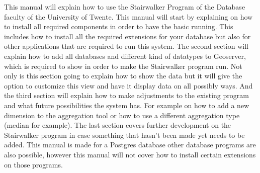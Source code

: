 
This manual will explain how to use the Stairwalker Program of the Database faculty of the University of Twente. This manual will start by explaining on how to install all required components in order to have the basic running. This includes how to install all the required extensions for your database but also for other applications that are required to run this system. The second section will explain how to add all databases and different kind of datatypes to Geoserver, which is required to show in order to make the Stairwalker program run. Not only is this section going to explain how to show the data but it will give the option to customize this view and have it display data on all possibly ways. And the third section will explain how to make adjustments to the existing program and what future possibilities the system has. For example on how to add a new dimension to the aggregation tool or how to use a different aggregation type (median for example). The last section covers further development on the Stairwalker program in case something that hasn't been made yet needs to be added. This manual is made for a Postgres database other database programs are also possible, however this manual will not cover how to install certain extensions on those programs.